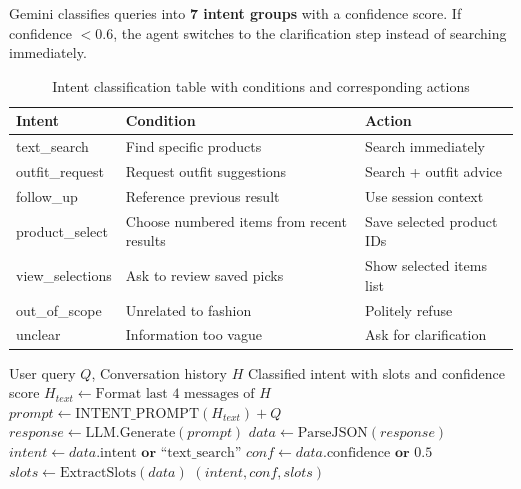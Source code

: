 \begin{tcolorbox}[title=Method: LLM Few-shot Intent Classification]
Gemini classifies queries into \textbf{7 intent groups} with a confidence score. If confidence $< 0.6$, the agent switches to the clarification step instead of searching immediately.
\end{tcolorbox}

\begin{table}[H]
\centering
\begin{tabular}{p{2.9cm}p{4.8cm}p{4.8cm}}
\toprule
\textbf{Intent} & \textbf{Condition} & \textbf{Action}\\
\midrule
text\_search    & Find specific products         & Search immediately\\
outfit\_request & Request outfit suggestions     & Search + outfit advice\\
follow\_up      & Reference previous result      & Use session context\\
product\_select & Choose numbered items from recent results & Save selected product IDs\\
view\_selections & Ask to review saved picks      & Show selected items list\\
out\_of\_scope  & Unrelated to fashion           & Politely refuse\\
unclear         & Information too vague          & Ask for clarification\\
\bottomrule
\end{tabular}
\caption{Intent classification table with conditions and corresponding actions}
\end{table}

\begin{algorithm}[H]
\caption{LLM-based Intent Classification}\label{alg:intent_class}
\begin{algorithmic}[1]
\Require User query $Q$, Conversation history $H$
\Ensure Classified intent with slots and confidence score
    \State $H_{text} \gets \text{Format last 4 messages of } H$
    \State $prompt \gets \text{INTENT\_PROMPT}(H_{text}) + Q$
    \State $response \gets \text{LLM.Generate}(prompt)$
    \State $data \gets \text{ParseJSON}(response)$
    \State $intent \gets data.\text{intent} \textbf{ or } \text{``text\_search''}$
    \State $conf \gets data.\text{confidence} \textbf{ or } 0.5$
    \State $slots \gets \text{ExtractSlots}(data)$
    \State \Return $(intent, conf, slots)$
\EndFunction
\end{algorithmic}
\end{algorithm}

